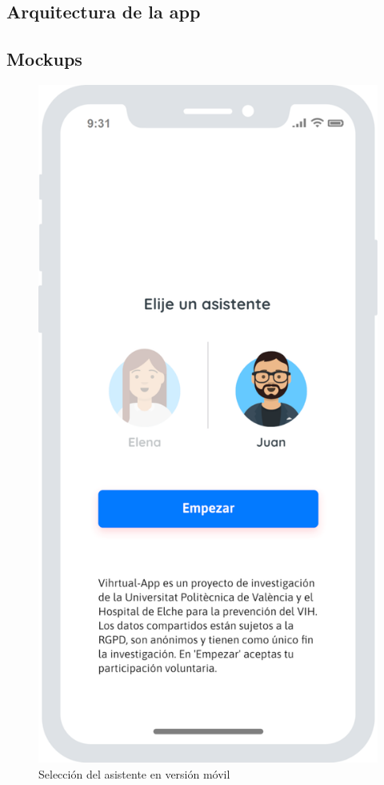 \subsection{Arquitectura de la app}

\subsection{Mockups}




\begin{figure}[htbp]
\centering
\includegraphics[scale=0.2]{../images/mobile_avatar.png} 
\caption{Selección del asistente en versión móvil}
\label{fig:mobile avatar	}
\end{figure}

